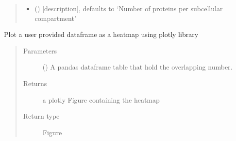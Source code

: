 \documentclass[letterpaper,10pt,english]{sphinxmanual}
\begin{document}
\begin{fulllineitems}
\begin{quote}
\begin{description}
\begin{itemize}
\item {} 
 (\sphinxstyleliteralemphasis{\sphinxupquote{, }}) \textendash{} {[}description{]}, defaults to ‘Number of proteins per sub\sphinxhyphen{}cellular compartment’

\end{itemize}

\end{description}\end{quote}

\end{fulllineitems}


\begin{fulllineitems}
\label{\detokenize{IPTK.Visualization:IPTK.Visualization.vizTools.plotly_overlap_heatmap}}
Plot a user provided dataframe as a heatmap using plotly library
\begin{quote}\begin{description}
\item[{Parameters}] \leavevmode
{} () \textendash{} A pandas dataframe table that hold the overlapping number.

\item[{Returns}] \leavevmode
a plotly Figure containing the heatmap

\item[{Return type}] \leavevmode
Figure

\end{description}\end{quote}

\end{fulllineitems}

\end{document}

